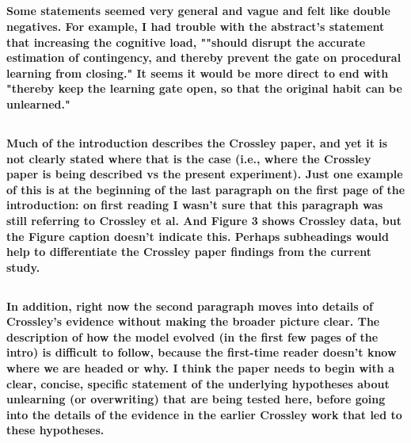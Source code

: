 \documentclass[10pt,a4paper]{article} \usepackage{amsmath} \usepackage{parskip}
\begin{document}
\subsection{} \textbf{
  Some statements seemed very general and vague and felt like double negatives.
  For example, I had trouble with the abstract's statement that increasing the
  cognitive load, ""should disrupt the accurate estimation of contingency, and
  thereby prevent the gate on procedural learning from closing." It seems it would
  be more direct to end with "thereby keep the learning gate open, so that the
  original habit can be unlearned."
}

\subsection{} \textbf{
  Much of the introduction describes the Crossley paper, and yet it is not clearly
  stated where that is the case (i.e., where the Crossley paper is being described
  vs the present experiment). Just one example of this is at the beginning of the
  last paragraph on the first page of the introduction: on first reading I wasn't
  sure that this paragraph was still referring to Crossley et al. And Figure 3
  shows Crossley data, but the Figure caption doesn't indicate this. Perhaps
  subheadings would help to differentiate the Crossley paper findings from the
  current study.
}

\subsection{} \textbf{
  In addition, right now the second paragraph moves into details of Crossley's
  evidence without making the broader picture clear. The description of how the
  model evolved (in the first few pages of the intro) is difficult to follow,
  because the first-time reader doesn't know where we are headed or why. I think
  the paper needs to begin with a clear, concise, specific statement of the
  underlying hypotheses about unlearning (or overwriting) that are being tested
  here, before going into the details of the evidence in the earlier Crossley work
  that led to these hypotheses.
}
\end{document}
